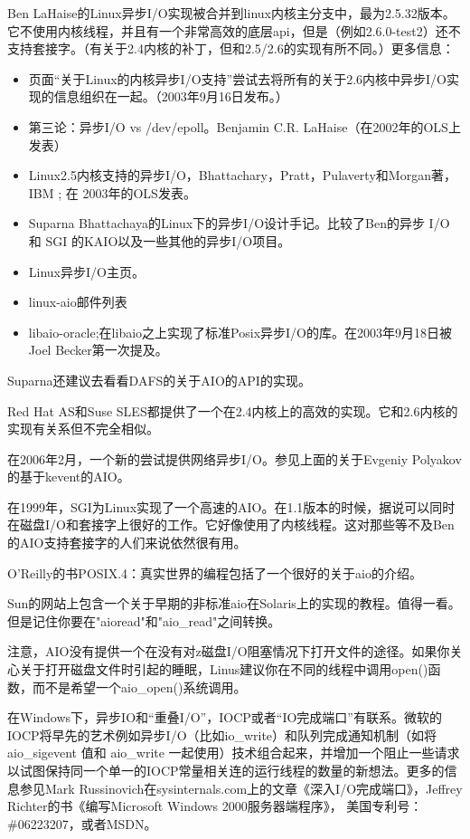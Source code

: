 \documentclass[twoside, xetex]{report}
\begin{document}
	Ben LaHaise的Linux异步I/O实现被合并到linux内核主分支中，最为2.5.32版本。它不使用内核线程，并且有一个非常高效的底层api，但是（例如2.6.0-test2）还不支持套接字。（有关于2.4内核的补丁，但和2.5/2.6的实现有所不同。）更多信息：

	\begin{itemize}
		\item 页面“关于Linux的内核异步I/O支持”尝试去将所有的关于2.6内核中异步I/O实现的信息组织在一起。（2003年9月16日发布。）
		\item 第三论：异步I/O vs /dev/epoll。Benjamin C.R. LaHaise（在2002年的OLS上发表）
		\item Linux2.5内核支持的异步I/O，Bhattachary，Pratt，Pulaverty和Morgan著，IBM ; 在 2003年的OLS发表。
		\item Suparna Bhattachaya的Linux下的异步I/O设计手记。比较了Ben的异步 I/O 和 SGI 的KAIO以及一些其他的异步I/O项目。
		\item Linux异步I/O主页。
		\item linux-aio邮件列表
		\item libaio-oracle;在libaio之上实现了标准Posix异步I/O的库。在2003年9月18日被Joel Becker第一次提及。
	\end{itemize}

	Suparna还建议去看看DAFS的关于AIO的API的实现。

	Red Hat AS和Suse SLES都提供了一个在2.4内核上的高效的实现。它和2.6内核的实现有关系但不完全相似。

	在2006年2月，一个新的尝试提供网络异步I/O。参见上面的关于Evgeniy Polyakov的基于kevent的AIO。

	在1999年，SGI为Linux实现了一个高速的AIO。在1.1版本的时候，据说可以同时在磁盘I/O和套接字上很好的工作。它好像使用了内核线程。这对那些等不及Ben的AIO支持套接字的人们来说依然很有用。

	O'Reilly的书POSIX.4：真实世界的编程包括了一个很好的关于aio的介绍。

	Sun的网站上包含一个关于早期的非标准aio在Solaris上的实现的教程。值得一看。但是记住你要在"aioread"和"aio\_read"之间转换。

	注意，AIO没有提供一个在没有对z磁盘I/O阻塞情况下打开文件的途径。如果你关心关于打开磁盘文件时引起的睡眠，Linus建议你在不同的线程中调用open()函数，而不是希望一个aio\_open()系统调用。

	在Windows下，异步IO和“重叠I/O”，IOCP或者“IO完成端口”有联系。微软的IOCP将早先的艺术例如异步I/O（比如io\_write）和队列完成通知机制（如将\\aio\_sigevent 值和 aio\_write 一起使用）技术组合起来，并增加一个阻止一些请求以试图保持同一个单一的IOCP常量相关连的运行线程的数量的新想法。更多的信息参见Mark Russinovich在sysinternals.com上的文章《深入I/O完成端口》，Jeffrey Richter的书《编写Microsoft Windows 2000服务器端程序》， 美国专利号：\#06223207，或者MSDN。
\end{document}
